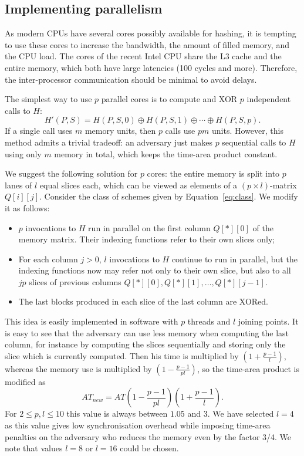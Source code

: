 \documentclass[a4paper]{article}
\begin{document}
 \subsection{Implementing parallelism}\label{sec:parall}

As modern CPUs have several cores possibly available  for hashing, it is tempting to use these cores to increase the bandwidth, the amount of filled memory, and the CPU load.
The cores of the recent Intel CPU share the L3 cache and the entire memory, which both have large latencies (100 cycles and more). Therefore, the inter-processor communication should be minimal to avoid delays.

The simplest way to use  $p$ parallel cores is to compute and XOR $p$ independent calls to $H$:
$$
H'(P,S) = H(P,S, 0)\oplus H(P,S,1)\oplus \cdots \oplus H(P,S,p).
$$
If a single call uses $m$ memory units, then $p$ calls use $pm$ units. However, this method admits a trivial tradeoff: an adversary just makes $p$ sequential calls to $H$ using only $m$ memory in total, which keeps the time-area product constant.

We suggest the following solution for $p$ cores: the entire memory is split  into $p$ lanes of  $l$ equal slices each, which can be viewed as elements of a $(p\times l)$-matrix $Q[i][j]$. Consider the class of
schemes given by Equation~\eqref{eq:class}. We modify it as follows:
\begin{itemize}
  \item $p$ invocations to $H$ run in parallel on the first column $Q[*][0]$ of the memory matrix. Their indexing functions refer to their own slices only;
  \item For each  column $j>0$, $l$ invocations to $H$ continue to run in parallel, but the indexing functions now may refer not only to their own slice, but also to all $jp$ slices of previous columns $Q[*][0],Q[*][1],\ldots,Q[*][j-1]$.
  \item The last blocks produced in each slice of the last column are XORed.
\end{itemize}
This idea is easily implemented in software with $p$ threads and $l$ joining points. It is easy to see that the adversary can use less memory when computing the last column, for instance
by computing the slices sequentially and storing only the slice which is currently computed. Then his time is multiplied by $(1+\frac{p-1}{l})$, whereas the memory use is multiplied
by $(1-\frac{p-1}{pl})$, so the time-area product is modified as
$$
AT_{new} = AT \left(1-\frac{p-1}{pl}\right)\left(1+\frac{p-1}{l}\right).
$$
For $2 \leq p,l \leq 10$ this value is always between $1.05$ and $3$. We have selected $l=4$ as this value gives low synchronisation overhead while imposing time-area penalties on the adversary who reduces the memory even by the factor 3/4. We note that values $l=8$ or $l=16$ could be chosen.
\end{document}
